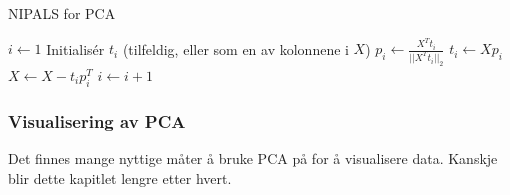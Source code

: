 \begin{algorithm}
	\caption{NIPALS for PCA}\label{alg:nipals_pca} \begin{algorithmic}[1] 
	\State $i \gets 1$
	\State Initialisér $t_i$ (tilfeldig, eller som en av kolonnene i $X$)
	\State $p_i \gets \frac{X^T t_i}{|| X^T t_i ||_2}$ 
	\State $t_i \gets X p_i$ 
	\EndWhile
	\State $X \gets X - t_i p_i^T$ 
	\State $i \gets i + 1$
	\EndWhile
\EndProcedure
\end{algorithmic}
\end{algorithm}


\subsubsection{Visualisering av PCA}
Det finnes mange nyttige måter å bruke PCA på for å visualisere data. Kanskje blir dette kapitlet lengre etter hvert.

